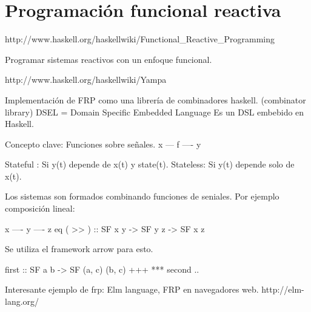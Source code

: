 

\section{Programación funcional reactiva}

http://www.haskell.org/haskellwiki/Functional_Reactive_Programming

Programar sistemas reactivos con un enfoque funcional.
  

http://www.haskell.org/haskellwiki/Yampa

Implementación de FRP como una librería de combinadores haskell. (combinator library)
DSEL = Domain Specific Embedded Language
Es un DSL embebido en Haskell.

Concepto clave: Funciones sobre señales. x --- f ---- y

Stateful : Si y(t) depende de x(t) y state(t).
Stateless: Si y(t) depende solo de x(t).

Los sistemas son formados combinando funciones de seniales. 
Por ejemplo composición lineal:

 x ---- y ---- z   eq
( >> ) ::  SF x y -> SF y z -> SF x z

Se utiliza el framework arrow para esto.

first :: SF a b -> SF (a, c) (b, c)
+++
***
second
..

Interesante ejemplo de frp: Elm language, FRP en navegadores web. http://elm-lang.org/
